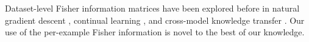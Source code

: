 \documentclass[dvipsnames]{article}
\begin{document}
Dataset-level Fisher information matrices have been explored before in natural gradient descent \citep{martens2020new}, continual learning \citep{kirkpatrick2017overcoming}, and cross-model knowledge transfer \citep{matena2021merging}.
Our use of the per-example Fisher information is novel to the best of our knowledge.


















\end{document}
